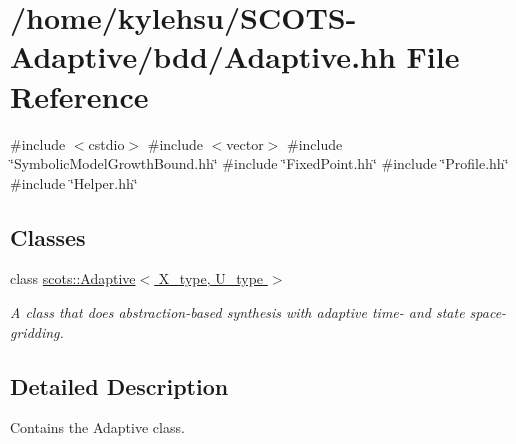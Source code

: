 \hypertarget{Adaptive_8hh}{}\section{/home/kylehsu/\+S\+C\+O\+T\+S-\/\+Adaptive/bdd/\+Adaptive.hh File Reference}
\label{Adaptive_8hh}
{\ttfamily \#include $<$cstdio$>$}\newline
{\ttfamily \#include $<$vector$>$}\newline
{\ttfamily \#include \char`\"{}Symbolic\+Model\+Growth\+Bound.\+hh\char`\"{}}\newline
{\ttfamily \#include \char`\"{}Fixed\+Point.\+hh\char`\"{}}\newline
{\ttfamily \#include \char`\"{}Profile.\+hh\char`\"{}}\newline
{\ttfamily \#include \char`\"{}Helper.\+hh\char`\"{}}\newline
\subsection*{Classes}
\begin{DoxyCompactItemize}
\item 
class \hyperlink{classscots_1_1Adaptive}{scots\+::\+Adaptive$<$ X\+\_\+type, U\+\_\+type $>$}
\begin{DoxyCompactList}\small\item\em A class that does abstraction-\/based synthesis with adaptive time-\/ and state space-\/gridding. \end{DoxyCompactList}\end{DoxyCompactItemize}


\subsection{Detailed Description}
Contains the Adaptive class. 
